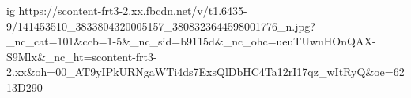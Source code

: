  
 
 
 
 

\ifcmt
  ig https://scontent-frt3-2.xx.fbcdn.net/v/t1.6435-9/141453510_3833804320005157_3808323644598001776_n.jpg?_nc_cat=101&ccb=1-5&_nc_sid=b9115d&_nc_ohc=ueuTUwuHOnQAX-S9Mlx&_nc_ht=scontent-frt3-2.xx&oh=00_AT9yIPkURNgaWTi4ds7ExsQlDbHC4Ta12rI17qz_wItRyQ&oe=6213D290
\fi
